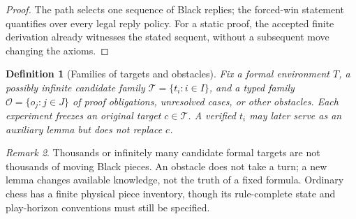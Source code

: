 \documentclass[11pt,letterpaper]{article}
\newtheorem{definition}{Definition}[section]
\theoremstyle{remark}
\newtheorem{remark}[definition]{Remark}
\begin{document}
\begin{proof}
The path selects one sequence of Black replies; the forced-win statement quantifies over every legal reply policy. For a static proof, the accepted finite derivation already witnesses the stated sequent, without a subsequent move changing the axioms.
\end{proof}
\begin{definition}[Families of targets and obstacles]
Fix a formal environment $T$, a possibly infinite candidate family $\mathcal T=\{t_i:i\in I\}$, and a typed family $\mathcal O=\{o_j:j\in J\}$ of proof obligations, unresolved cases, or other obstacles. Each experiment freezes an original target $c\in\mathcal T$. A verified $t_i$ may later serve as an auxiliary lemma but does not replace $c$.
\end{definition}
\begin{remark}
Thousands or infinitely many candidate formal targets are not thousands of moving Black pieces. An obstacle does not take a turn; a new lemma changes available knowledge, not the truth of a fixed formula. Ordinary chess has a finite physical piece inventory, though its rule-complete state and play-horizon conventions must still be specified.
\end{remark}
\end{document}

